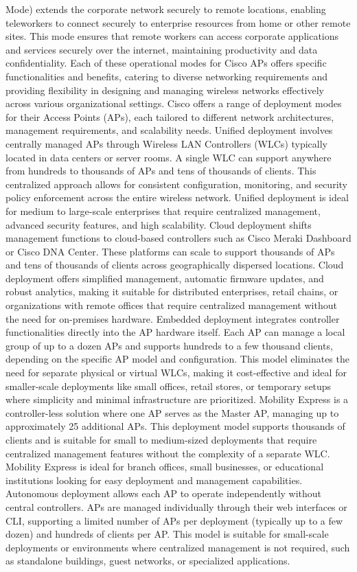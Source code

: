 \documentclass{article}
\begin{document}
\begin{itemize}
Mode) extends the corporate network securely to remote locations, enabling teleworkers to connect securely to enterprise resources from home or other remote sites. This mode ensures that remote workers can access corporate applications and services securely over the internet, maintaining productivity and data confidentiality. Each of these operational modes for Cisco APs offers specific functionalities and benefits, catering to diverse networking requirements and providing flexibility in designing and managing wireless networks effectively across various organizational settings.  Cisco offers a range of deployment modes for their Access Points (APs), each tailored to different network architectures, management requirements, and scalability needs. Unified deployment involves centrally managed APs through Wireless LAN Controllers (WLCs) typically located in data centers or server rooms. A single WLC can support anywhere from hundreds to thousands of APs and tens of thousands of clients. This centralized approach allows for consistent configuration, monitoring, and security policy enforcement across the entire wireless network. Unified deployment is ideal for medium to large-scale enterprises that require centralized management, advanced security features, and high scalability. Cloud deployment shifts management functions to cloud-based controllers such as Cisco Meraki Dashboard or Cisco DNA Center. These platforms can scale to support thousands of APs and tens of thousands of clients across geographically dispersed locations. Cloud deployment offers simplified management, automatic firmware updates, and robust analytics, making it suitable for distributed enterprises, retail chains, or organizations with remote offices that require centralized management without the need for on-premises hardware. Embedded deployment integrates controller functionalities directly into the AP hardware itself. Each AP can manage a local group of up to a dozen APs and supports hundreds to a few thousand clients, depending on the specific AP model and configuration. This model eliminates the need for separate physical or virtual WLCs, making it cost-effective and ideal for smaller-scale deployments like small offices, retail stores, or temporary setups where simplicity and minimal infrastructure are prioritized. Mobility Express is a controller-less solution where one AP serves as the Master AP, managing up to approximately 25 additional APs. This deployment model supports thousands of clients and is suitable for small to medium-sized deployments that require centralized management features without the complexity of a separate WLC. Mobility Express is ideal for branch offices, small businesses, or educational institutions looking for easy deployment and management capabilities. Autonomous deployment allows each AP to operate independently without central controllers. APs are managed individually through their web interfaces or CLI, supporting a limited number of APs per deployment (typically up to a few dozen) and hundreds of clients per AP. This model is suitable for small-scale deployments or environments where centralized management is not required, such as standalone buildings, guest networks, or specialized applications.
  	

\end{itemize}
\end{document}
